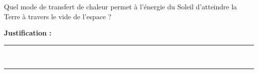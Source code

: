 Quel mode de transfert de chaleur permet à l'énergie du Soleil d'atteindre la Terre à travers le vide de l'espace ?

\choices

\noindent\textbf{Justification :} \hrulefill \\[2.5ex]
\rule{\linewidth}{0.4pt} \\[2.5ex]
\rule{\linewidth}{0.4pt}
\vfill
